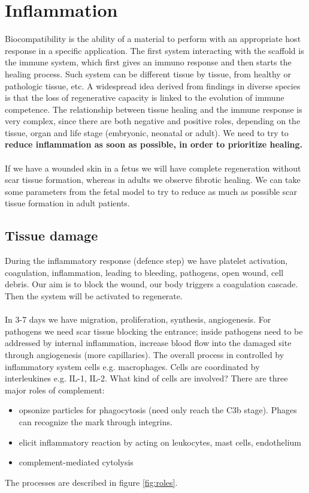 \graphicspath{{chapters/inflammation/}}
\chapter{Inflammation}

Biocompatibility is the ability of a material to perform with an appropriate host response in a specific application.
The first system interacting with the scaffold is the immune system, which first gives an immuno response and then starts the healing process. 
Such system can be different tissue by tissue, from healthy or pathologic tissue, etc.
A widespread idea derived from findings in diverse species is that the loss of regenerative capacity is linked to the evolution of immune competence. 
The relationship between tissue healing and the immune response is very complex, since there are both negative and positive roles, depending on the tissue, organ and life stage (embryonic, neonatal or adult). We need to try to \textbf{reduce inflammation as soon as possible, in order to prioritize healing.}
\\
\\
\noindent
If we have a wounded skin in a fetus we will have complete regeneration without scar tissue formation, whereas in adults we observe fibrotic healing. We can take some parameters from the fetal model to try to reduce as much as possible scar tissue formation in adult patients.

\section{Tissue damage}
During the inflammatory response (defence step) we have platelet activation, coagulation, inflammation, leading to bleeding, pathogens, open wound, cell debris. 
Our aim is to block the wound, our body triggers a coagulation cascade. 
Then the system will be activated to regenerate. 
\\
\\
\noindent
In 3-7 days we have migration, proliferation, synthesis, angiogenesis. 
For pathogens we need scar tissue blocking the entrance; inside pathogens need to be addressed by internal inflammation, increase blood flow into the damaged site through angiogenesis (more capillaries).
The overall process in controlled by inflammatory system cells e.g. macrophages. 
Cells are coordinated by interleukines e.g. IL-1, IL-2.
\noindent
What kind of cells are involved? There are three major roles of complement:
\begin{itemize}
\item opsonize particles for phagocytosis (need only reach the C3b stage). Phages can recognize the mark through integrins.
\item elicit inflammatory reaction by acting on leukocytes, mast cells, endothelium
\item complement-mediated cytolysis
\end{itemize}
\noindent
The processes are described in figure \ref{fig:roles}.

